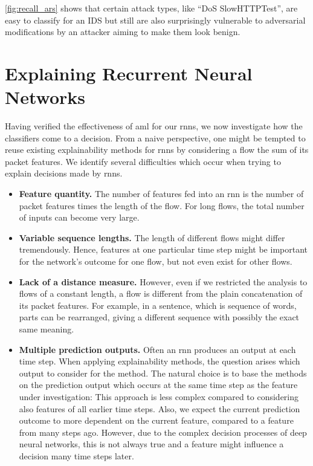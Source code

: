 \documentclass[conference]{IEEEtran}
\begin{document}
\autoref{fig:recall_ars} shows that certain attack types, like ``DoS SlowHTTPTest'', are easy to classify for an IDS but still are also surprisingly vulnerable to adversarial modifications by an attacker aiming to make them look benign.

\section{Explaining Recurrent Neural Networks}
Having verified the effectiveness of \gls{aml}  for our \glspl{rnn}, we now  investigate how the classifiers come to a decision.
From a naive perspective, one might be tempted to reuse existing explainability methods for \glspl{rnn} by considering a flow the sum of its packet features.
We identify several difficulties which occur when trying to explain decisions made by \glspl{rnn}.

\begin{itemize}[topsep=0pt,wide,labelwidth=!,labelindent=0pt]
\item
\textbf{Feature quantity.}
The number of features fed into an \gls{rnn} is the number of packet features times the length of the flow. For long flows, the total number of inputs can become very large.

\item
\textbf{Variable sequence lengths.}
The length of different flows might differ tremendously. Hence, features at one particular time step might be important for the network's outcome for one flow, but not even exist for other flows. 

\item
\textbf{Lack of a distance measure.}
However, even if we restricted the analysis to flows of a constant length, a flow is different from the plain concatenation of its packet features.
For example, in a sentence, which is sequence of words, parts can be rearranged, giving a different sequence with possibly the exact same meaning. 

\item
\textbf{Multiple prediction outputs.}
Often an \gls{rnn} produces an output at each time step. When  applying explainability methods, the question arises which output to consider for the method. The natural choice is to base the methods on the prediction output which occurs at the same time step as the feature under investigation: This approach is less complex compared to considering also features of all earlier time steps. Also, we expect the current prediction outcome to more dependent on the current feature, compared to a feature from many steps ago. 
However, due to the complex decision processes of deep neural networks,
this is not always true and a feature might influence a decision many time steps later. 
\end{itemize}
\end{document}
